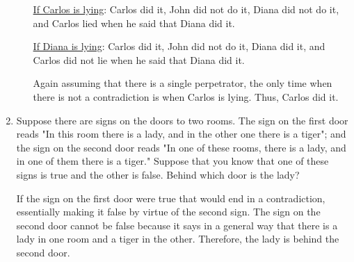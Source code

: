 \documentclass[11pt]{article}
\begin{document}
\begin{enumerate}[label=\textbf{\arabic*.}]
\begin{enumerate}[label=\textbf{\alph*)}]
		\underline{If Carlos is lying}: Carlos did it, John did not do it, Diana did not do it, and Carlos lied when he said that Diana did it.
		
		\underline{If Diana is lying}: Carlos did it, John did not do it, Diana did it, and Carlos did not lie when he said that Diana did it.
		
		Again assuming that there is a single perpetrator, the only time when there is not a contradiction is when Carlos is lying. Thus, Carlos did it.
	\end{enumerate}

	\item Suppose there are signs on the doors to two rooms. The sign on the first door reads "In this room there is a lady, and in the other one there is a tiger"; and the sign on the second door reads "In one of these rooms, there is a lady, and in one of them there is a tiger." Suppose that you know that one of these signs is true and the other is false. Behind which door is the lady?
	
	If the sign on the first door were true that would end in a contradiction, essentially making it false by virtue of the second sign. The sign on the second door cannot be false because it says in a general way that there is a lady in one room and a tiger in the other. Therefore, the lady is behind the second door.
\end{enumerate}
\end{document}

